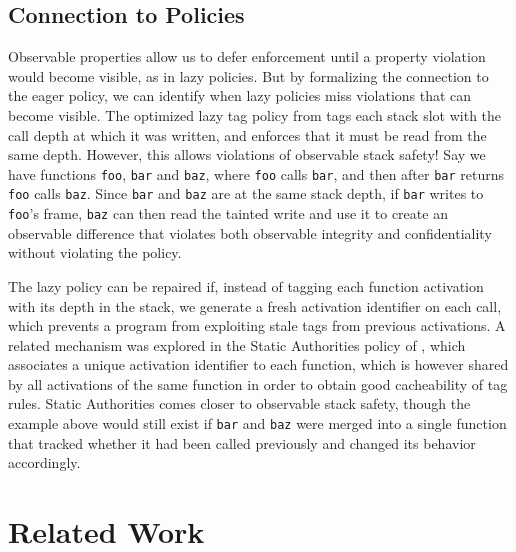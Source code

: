 \documentclass[acmsmall,review,anonymous]{acmart}\settopmatter{printfolios=true,printccs=false,printacmref=false}
\begin{document}

\subsection{Connection to Policies}

    Observable properties allow us to defer enforcement until a property
    violation would become visible, as in lazy policies. But by formalizing
    the connection to the eager policy, we can identify when lazy policies
    miss violations that can become visible. The optimized lazy tag policy from
    \citet{DBLP:conf/sp/RoesslerD18} tags each stack slot with the call depth
    at which it was written, and enforces that it must be read from the
    same depth. However, this allows violations of observable stack safety!
    Say we have functions {\tt foo}, {\tt bar} and {\tt baz}, where {\tt foo}
    calls {\tt bar}, and then after {\tt bar} returns {\tt foo} calls
    {\tt baz}. Since {\tt bar} and {\tt baz} are at the same stack depth, if
    {\tt bar} writes to {\tt foo}'s frame, {\tt baz} can then read the tainted
    write and use it to create an observable difference that violates both
    observable integrity and confidentiality without violating the policy.

    The lazy policy can be repaired if, instead of tagging each function
    activation with its depth in the stack, we generate a fresh activation
    identifier on each call, which prevents a program from exploiting stale
    tags from previous activations. A related mechanism was explored in the
    Static Authorities policy of \citet{DBLP:conf/sp/RoesslerD18}, which
    associates a unique activation identifier to each function, which is
    however shared by all activations of the same function in order to obtain
    good cacheability of tag rules. Static Authorities comes closer to
    observable stack safety, though the example above would still exist
    if {\tt bar} and {\tt baz} were merged into a single function that tracked
    whether it had been called previously and changed its behavior accordingly.
    \ifaftersubmission{}\fi

\section{Related Work}
\label{sec:relwork}
\end{document}
